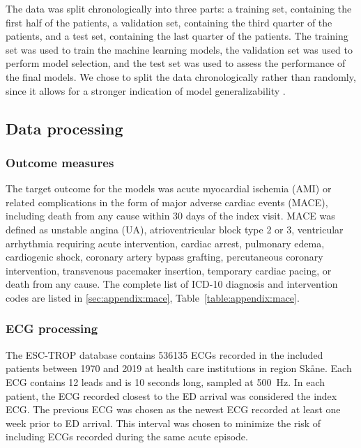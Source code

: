 \documentclass[preprint]{elsarticle}
\begin{document}
The data was split chronologically into three parts: a training set, containing the first half of the patients, a validation set, containing the third quarter of the patients, and a test set, containing the last quarter of the patients. The training set was used to train the machine learning models, the validation set was used to perform model selection, and the test set was used to assess the performance of the final models. We chose to split the data chronologically rather than randomly, since it allows for a stronger indication of model generalizability \citep{steyerberg2009}.


\subsection{Data processing}
\subsubsection{Outcome measures}
The target outcome for the models was acute myocardial ischemia (AMI) or related complications in the form of major adverse cardiac events (MACE), including death from any cause within 30 days of the index visit. MACE was defined as unstable angina (UA), atrioventricular block type 2 or 3, ventricular arrhythmia requiring acute intervention, cardiac arrest, pulmonary edema, cardiogenic shock, coronary artery bypass grafting, percutaneous coronary intervention, transvenous pacemaker insertion, temporary cardiac pacing, or death from any cause. The complete list of ICD-10 diagnosis and intervention codes are listed in \ref{sec:appendix:mace}, Table~\ref{table:appendix:mace}.

\subsubsection{ECG processing}
The ESC-TROP database contains 536135 ECGs recorded in the included patients between 1970 and 2019 at health care institutions in region Sk\aa{}ne. Each ECG contains 12 leads and is 10 seconds long, sampled at \SI{500}{\hertz}. In each patient, the ECG recorded closest to the ED arrival was considered the index ECG. The previous ECG was chosen as the newest ECG recorded at least one week prior to ED arrival. This interval was chosen to minimize the risk of including ECGs recorded during the same acute episode.
\end{document}
